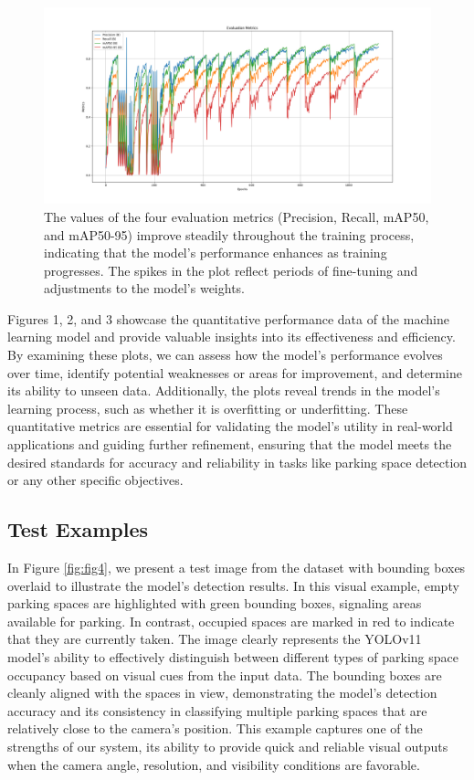 \documentclass[conference]{IEEEtran}
\begin{document}
\begin{figure}[h]
    \centering
    \includegraphics[scale=0.2]{Figure_3.png}
    \caption{
        The values of the four evaluation metrics 
        (Precision, Recall, mAP50, and mAP50-95) 
        improve steadily throughout the training process, 
        indicating that the model's performance enhances as training progresses. 
        The spikes in the plot reflect periods of fine-tuning and adjustments to the model’s weights.   
    }
    \label{fig:fig3}
\end{figure}

Figures 1, 
2, 
and 3 showcase the quantitative performance data of the machine learning model and provide valuable insights into its effectiveness and efficiency. 
By examining these plots, 
we can assess how the model's performance evolves over time, 
identify potential weaknesses or areas for improvement, 
and determine its ability to unseen data. 
Additionally, 
the plots reveal trends in the model's learning process, 
such as whether it is overfitting or underfitting. 
These quantitative metrics are essential for validating the model’s utility in real-world applications and guiding further refinement, 
ensuring that the model meets the desired standards for accuracy and reliability in tasks like parking space detection or any other specific objectives.


\subsection{Test Examples}

In Figure \ref{fig:fig4}, we present a test image from the dataset with bounding boxes overlaid to illustrate the model’s detection results. In this visual example, empty parking spaces are highlighted with green bounding boxes, signaling areas available for parking. In contrast, occupied spaces are marked in red to indicate that they are currently taken. The image clearly represents the YOLOv11 model’s ability to effectively distinguish between different types of parking space occupancy based on visual cues from the input data. The bounding boxes are cleanly aligned with the spaces in view, demonstrating the model’s detection accuracy and its consistency in classifying multiple parking spaces that are relatively close to the camera's position. This example captures one of the strengths of our system, its ability to provide quick and reliable visual outputs when the camera angle, resolution, and visibility conditions are favorable.
\end{document}
